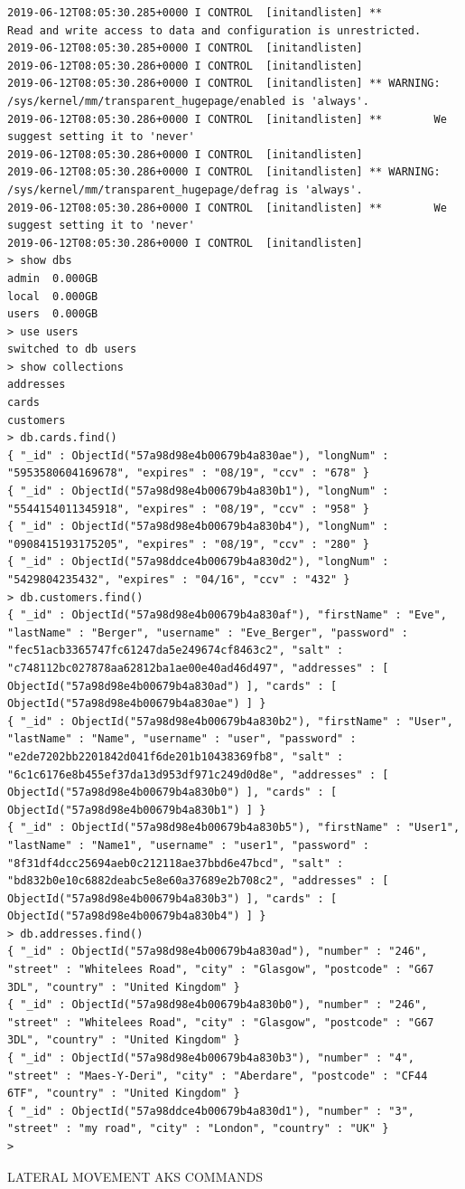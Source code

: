 \begin{lstlisting}
2019-06-12T08:05:30.285+0000 I CONTROL  [initandlisten] **          Read and write access to data and configuration is unrestricted.
2019-06-12T08:05:30.285+0000 I CONTROL  [initandlisten]
2019-06-12T08:05:30.286+0000 I CONTROL  [initandlisten]
2019-06-12T08:05:30.286+0000 I CONTROL  [initandlisten] ** WARNING: /sys/kernel/mm/transparent_hugepage/enabled is 'always'.
2019-06-12T08:05:30.286+0000 I CONTROL  [initandlisten] **        We suggest setting it to 'never'
2019-06-12T08:05:30.286+0000 I CONTROL  [initandlisten]
2019-06-12T08:05:30.286+0000 I CONTROL  [initandlisten] ** WARNING: /sys/kernel/mm/transparent_hugepage/defrag is 'always'.
2019-06-12T08:05:30.286+0000 I CONTROL  [initandlisten] **        We suggest setting it to 'never'
2019-06-12T08:05:30.286+0000 I CONTROL  [initandlisten]
> show dbs
admin  0.000GB
local  0.000GB
users  0.000GB
> use users
switched to db users
> show collections
addresses
cards
customers
> db.cards.find()
{ "_id" : ObjectId("57a98d98e4b00679b4a830ae"), "longNum" : "5953580604169678", "expires" : "08/19", "ccv" : "678" }
{ "_id" : ObjectId("57a98d98e4b00679b4a830b1"), "longNum" : "5544154011345918", "expires" : "08/19", "ccv" : "958" }
{ "_id" : ObjectId("57a98d98e4b00679b4a830b4"), "longNum" : "0908415193175205", "expires" : "08/19", "ccv" : "280" }
{ "_id" : ObjectId("57a98ddce4b00679b4a830d2"), "longNum" : "5429804235432", "expires" : "04/16", "ccv" : "432" }
> db.customers.find()
{ "_id" : ObjectId("57a98d98e4b00679b4a830af"), "firstName" : "Eve", "lastName" : "Berger", "username" : "Eve_Berger", "password" : "fec51acb3365747fc61247da5e249674cf8463c2", "salt" : "c748112bc027878aa62812ba1ae00e40ad46d497", "addresses" : [ ObjectId("57a98d98e4b00679b4a830ad") ], "cards" : [ ObjectId("57a98d98e4b00679b4a830ae") ] }
{ "_id" : ObjectId("57a98d98e4b00679b4a830b2"), "firstName" : "User", "lastName" : "Name", "username" : "user", "password" : "e2de7202bb2201842d041f6de201b10438369fb8", "salt" : "6c1c6176e8b455ef37da13d953df971c249d0d8e", "addresses" : [ ObjectId("57a98d98e4b00679b4a830b0") ], "cards" : [ ObjectId("57a98d98e4b00679b4a830b1") ] }
{ "_id" : ObjectId("57a98d98e4b00679b4a830b5"), "firstName" : "User1", "lastName" : "Name1", "username" : "user1", "password" : "8f31df4dcc25694aeb0c212118ae37bbd6e47bcd", "salt" : "bd832b0e10c6882deabc5e8e60a37689e2b708c2", "addresses" : [ ObjectId("57a98d98e4b00679b4a830b3") ], "cards" : [ ObjectId("57a98d98e4b00679b4a830b4") ] }
> db.addresses.find()
{ "_id" : ObjectId("57a98d98e4b00679b4a830ad"), "number" : "246", "street" : "Whitelees Road", "city" : "Glasgow", "postcode" : "G67 3DL", "country" : "United Kingdom" }
{ "_id" : ObjectId("57a98d98e4b00679b4a830b0"), "number" : "246", "street" : "Whitelees Road", "city" : "Glasgow", "postcode" : "G67 3DL", "country" : "United Kingdom" }
{ "_id" : ObjectId("57a98d98e4b00679b4a830b3"), "number" : "4", "street" : "Maes-Y-Deri", "city" : "Aberdare", "postcode" : "CF44 6TF", "country" : "United Kingdom" }
{ "_id" : ObjectId("57a98ddce4b00679b4a830d1"), "number" : "3", "street" : "my road", "city" : "London", "country" : "UK" }
>
\end{lstlisting}
\fi
LATERAL MOVEMENT AKS COMMANDS

